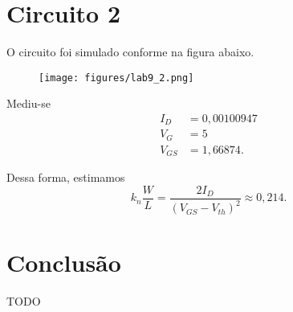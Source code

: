 \documentclass[a4paper]{report}
\begin{document}
\section*{Circuito 2}

O circuito foi simulado conforme na figura abaixo.

\begin{figure}[H]
    \centering
    \texttt{[image: figures/lab9\_2.png]}
\end{figure}

Mediu-se
\begin{align*}
    I_D &= 0,00100947 \\
    V_G &= 5 \\
    V_{GS} &= 1,66874
.\end{align*}

Dessa forma, estimamos \[
k_n \frac{W}{L} = \frac{2I_D}{\left( V_{GS}-V_{th} \right)^2 } \approx 0,214
.\] 


\section{Conclusão}

TODO
\end{document}
